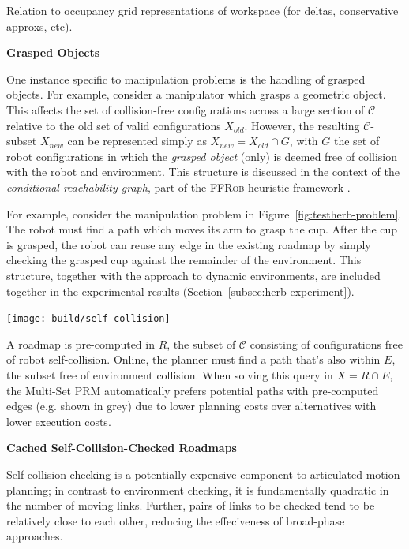 Relation to occupancy grid representations of workspace
(for deltas, conservative approxs, etc).

\vspace{0.1in}
\noindent
\textbf{Grasped Objects}
\label{subsec:grasped-objects}

One instance specific to manipulation problems is the handling of
grasped objects.
For example, 
consider a manipulator which grasps a geometric object.
This affects the set of collision-free configurations
across a large section of $\mathcal{C}$
relative to the old set of valid configurations $X_{old}$.
However,
the resulting $\mathcal{C}$-subset $X_{new}$
can be represented simply as
$X_{new} = X_{old} \cap G$,
with $G$ the set of robot configurations in which
the \emph{grasped object} (only)
is deemed free of collision with the robot and environment.
This structure is discussed in the context of the
\emph{conditional reachability graph},
part of the \textsc{FFRob} heuristic framework
\citep{garrett2014ffrob}.

For example,
consider the manipulation problem in
Figure~\ref{fig:testherb-problem}.
The robot must find a path which moves its arm to grasp the cup.
After the cup is grasped,
the robot can reuse any edge in the existing roadmap
by simply checking the grasped cup
against the remainder of the environment.
This structure,
together with the approach to dynamic environments,
are included together in the experimental results
(Section~\ref{subsec:herb-experiment}).

\begin{marginfigure}
   \centering
   \texttt{[image: build/self-collision]}
   \caption{A roadmap is pre-computed in $R$,
      the subset of $\mathcal{C}$ consisting of configurations free
      of robot self-collision.
      Online, the planner must find a path that's also within $E$,
      the subset free of environment collision.
      When solving this query in $X = R \cap E$,
      the Multi-Set PRM automatically prefers potential paths with
      pre-computed edges (e.g. shown in grey)
      due to lower planning costs over alternatives with lower
      execution costs.}
   \label{fig:self-collision-example}
\end{marginfigure}

\vspace{0.1in}
\noindent
\textbf{Cached Self-Collision-Checked Roadmaps}
\label{subsec:cached-self-valid}

Self-collision checking is a potentially expensive component to
articulated motion planning;
in contrast to environment checking,
it is fundamentally quadratic in the number of moving links.
Further, pairs of links to be checked
tend to be relatively close to each other,
reducing the effeciveness of broad-phase approaches.

